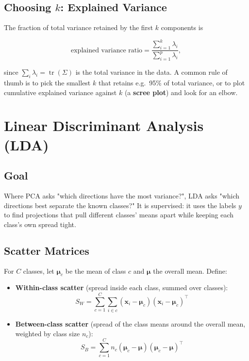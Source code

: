 \documentclass[11pt]{article}
\begin{document}
\subsection{Choosing \texorpdfstring{$k$}{k}: Explained Variance}

The fraction of total variance retained by the first $k$ components is

\[
  \text{explained variance ratio} = \frac{\sum_{i=1}^{k} \lambda_i}{\sum_{i=1}^{p} \lambda_i},
\]

since $\sum_i \lambda_i = \operatorname{tr}(\Sigma)$ is the total variance
in the data. A common rule of thumb is to pick the smallest $k$ that
retains e.g.\ 95\% of total variance, or to plot cumulative explained
variance against $k$ (a \textbf{scree plot}) and look for an elbow.

\section{Linear Discriminant Analysis (LDA)}

\subsection{Goal}

Where PCA asks "which directions have the most variance?", LDA asks
"which directions best separate the known classes?" It is supervised: it
uses the labels $y$ to find projections that pull different classes'
means apart while keeping each class's own spread tight.

\subsection{Scatter Matrices}

For $C$ classes, let $\boldsymbol{\mu}_c$ be the mean of class $c$ and
$\boldsymbol{\mu}$ the overall mean. Define:

\begin{itemize}
  \item \textbf{Within-class scatter} (spread inside each class, summed
        over classes):
        \[
          S_W = \sum_{c=1}^{C} \sum_{i \in c} (\mathbf{x}_i - \boldsymbol{\mu}_c)(\mathbf{x}_i - \boldsymbol{\mu}_c)^\top
        \]
  \item \textbf{Between-class scatter} (spread of the class means around
        the overall mean, weighted by class size $n_c$):
        \[
          S_B = \sum_{c=1}^{C} n_c (\boldsymbol{\mu}_c - \boldsymbol{\mu})(\boldsymbol{\mu}_c - \boldsymbol{\mu})^\top
        \]
\end{itemize}
\end{document}

